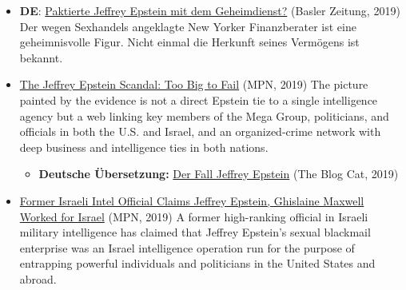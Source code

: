 \begin{itemize}
\tightlist
\item
  \textbf{DE}:
  \href{https://www.bazonline.ch/ausland/amerika/stand-jeffrey-epstein-den-geheimdiensten-pate/story/27888825}{Paktierte
  Jeffrey Epstein mit dem Geheimdienst?} (Basler Zeitung, 2019) Der
  wegen Sexhandels angeklagte New Yorker Finanzberater ist eine
  geheimnisvolle Figur. Nicht einmal die Herkunft seines Vermögens ist
  bekannt.
\item
  \href{https://www.mintpressnews.com/category/epstein-investigation/}{The
  Jeffrey Epstein Scandal: Too Big to Fail} (MPN, 2019) The picture
  painted by the evidence is not a direct Epstein tie to a single
  intelligence agency but a web linking key members of the Mega Group,
  politicians, and officials in both the U.S. and Israel, and an
  organized-crime network with deep business and intelligence ties in
  both nations.

  \begin{itemize}
  \tightlist
  \item
    \textbf{Deutsche Übersetzung:}
    \href{https://www.theblogcat.de/uebersetzungen/die-epstein-saga-teil-1/}{Der
    Fall Jeffrey Epstein} (The Blog Cat, 2019)
  \end{itemize}
\item
  \href{https://www.mintpressnews.com/ari-ben-menashe-jeffrey-epstein-ghislaine-maxwell-israel-intelligence/262162/}{Former
  Israeli Intel Official Claims Jeffrey Epstein, Ghislaine Maxwell
  Worked for Israel} (MPN, 2019) A former high-ranking official in
  Israeli military intelligence has claimed that Jeffrey Epstein's
  sexual blackmail enterprise was an Israel intelligence operation run
  for the purpose of entrapping powerful individuals and politicians in
  the United States and abroad.


\end{itemize}
